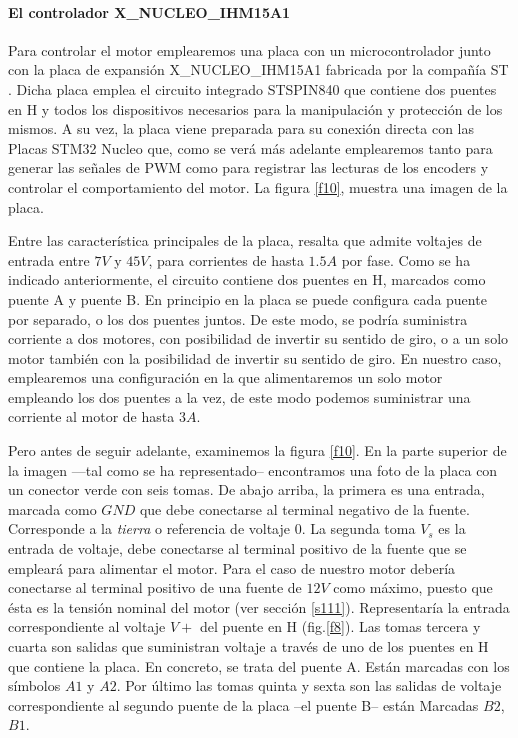 \documentclass[10pt,a4paper]{report}
\begin{document}
\paragraph{El controlador X\_NUCLEO\_IHM15A1} Para controlar el motor emplearemos una placa con un microcontrolador junto con  la placa de expansión X\_NUCLEO\_IHM15A1 fabricada por la compañía ST \cite{IHM15}. Dicha placa emplea el circuito integrado  STSPIN840  \cite{STSPIN840} que contiene dos puentes en H y todos los dispositivos necesarios para la manipulación y protección de los mismos. A su vez, la placa viene preparada para su conexión directa con las Placas STM32 Nucleo que, como se verá más adelante emplearemos tanto para generar las señales de PWM como para registrar las lecturas de los encoders y controlar el comportamiento del motor. La figura \ref{f10}, muestra una imagen de la placa. 

Entre las característica principales de la placa, resalta que admite voltajes de entrada entre $7V$ y $45V$, para corrientes de hasta $1.5 A$ por fase. Como se ha indicado anteriormente, el circuito contiene dos puentes en H, marcados como puente A y puente B.  En principio en la placa se puede configura  cada puente por separado, o los dos puentes juntos. De este modo, se podría suministra corriente a dos motores, con posibilidad de invertir su sentido de giro, o a un solo motor también con la posibilidad de invertir su sentido de giro. En nuestro caso, emplearemos  una configuración en la que alimentaremos un solo motor empleando los dos puentes a la vez, de este modo podemos suministrar una corriente al motor de hasta $3 A$.  

Pero antes de seguir adelante, examinemos la figura \ref{f10}. En la parte superior de la imagen ---tal como se ha representado-- encontramos una foto de la placa con un conector verde con seis tomas. De abajo arriba, la primera es una entrada, marcada como $GND$ que debe conectarse al terminal negativo de la fuente. Corresponde a la \emph{tierra} o referencia de voltaje $0$. La segunda toma $V_{s}$ es la entrada de voltaje, debe conectarse al terminal positivo de la fuente que se empleará para alimentar el motor. Para el caso de nuestro motor debería conectarse al terminal positivo de una fuente de $12V$ como máximo, puesto que ésta es la tensión nominal del motor (ver sección \ref{s111}). Representaría la entrada correspondiente al voltaje $V+$ del puente en H (fig.\ref{f8}).  Las tomas tercera y cuarta son salidas que suministran voltaje a través de uno de los puentes en H que contiene la placa. En concreto, se trata del puente A. Están marcadas con los símbolos $A1$ y $A2$. Por último las tomas quinta y sexta son las salidas de voltaje correspondiente al segundo puente de la placa --el puente B-- están Marcadas $B2$, $B1$.
\end{document}
